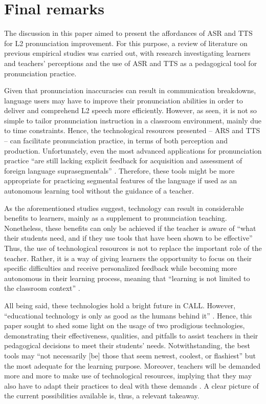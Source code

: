 \documentclass[english]{textolivre}
\begin{document}
\section{Final remarks}\label{sec-organizacao}
The discussion in this paper aimed to present the affordances of ASR and TTS for L2 pronunciation improvement. For this purpose, a review of literature on previous empirical studies was carried out, with research investigating learners and teachers’ perceptions and the use of ASR and TTS as a pedagogical tool for pronunciation practice.

Given that pronunciation inaccuracies can result in communication breakdowns, language users may have to improve their pronunciation abilities in order to deliver and comprehend L2 speech more efficiently. However, as seen, it is not so simple to tailor pronunciation instruction in a classroom environment, mainly due to time constraints. Hence, the technological resources presented – ARS and TTS – can facilitate pronunciation practice, in terms of both perception and production. Unfortunately, even the most advanced applications for pronunciation practice “are still lacking explicit feedback for acquisition and assessment of foreign language suprasegmentals” \cite[p. 3]{bogach_speech_2021}. Therefore, these tools might be more appropriate for practicing segmental features of the language if used as an autonomous learning tool without the guidance of a teacher.

As the aforementioned studies suggest, technology can result in considerable benefits to learners, mainly as a supplement to pronunciation teaching. Nonetheless, these benefits can only be achieved if the teacher is aware of “what their students need, and if they use tools that have been shown to be effective” \cite[p. 326]{darcy_powerful_2018} Thus, the use of technological resources is not to replace the important role of the teacher. Rather, it is a way of giving learners the opportunity to focus on their specific difficulties and receive personalized feedback while becoming more autonomous in their learning process, meaning that “learning is not limited to the classroom context” \cite[p. 104]{carlet_improving_2018}.

All being said, these technologies hold a bright future in CALL. However, “educational technology is only as good as the humans behind it” \cite[p. 201]{rogerson-revell_computer-assisted_2021}. Hence, this paper sought to shed some light on the usage of two prodigious technologies, demonstrating their effectiveness, qualities, and pitfalls to assist teachers in their pedagogical decisions to meet their students’ needs. Notwithstanding, the best tools may “not necessarily [be] those that seem newest, coolest, or ﬂashiest” \cite[p. 209]{yoshida_choosing_2018} but the most adequate for the learning purpose. Moreover, teachers will be demanded more and more to make use of technological resources, implying that they may also have to adapt their practices to deal with these demands \cite{menezes_tecnologias_2019}. A clear picture of the current possibilities available is, thus, a relevant takeaway.
\end{document}
